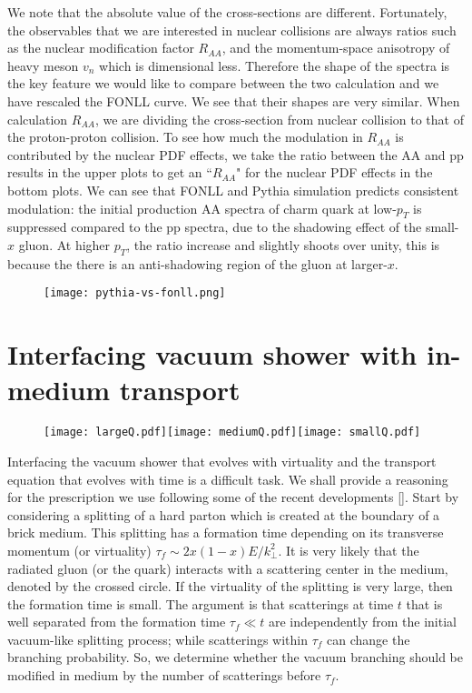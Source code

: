 We note that the absolute value of the cross-sections are different.
Fortunately, the observables that we are interested in nuclear collisions are always ratios such as the nuclear modification factor $R_{AA}$, and the momentum-space anisotropy of heavy meson $v_n$ which is dimensional less. 
Therefore the shape of the spectra is the key feature we would like to compare between the two calculation and we have rescaled the FONLL curve.
We see that their shapes are very similar.
When calculation $R_{AA}$, we are dividing the cross-section from nuclear collision to that of the proton-proton collision.
To see how much the modulation in $R_{AA}$ is contributed by the nuclear PDF effects, we take the ratio between the AA and pp results in the upper plots to get an ``$R_{AA}$" for the nuclear PDF effects in the bottom plots.
We can see that FONLL and Pythia simulation predicts consistent modulation: the initial production AA spectra of charm quark at low-$p_T$ is suppressed compared to the pp spectra, due to the shadowing effect of the small-$x$ gluon. 
At higher $p_T$, the ratio increase and slightly shoots over  unity, this is because the there is an anti-shadowing region of the gluon at larger-$x$.

\begin{figure}
\centering
\texttt{[image: pythia-vs-fonll.png]}
\caption{}
\label{fig:pythia-fonll}
\end{figure}

\section{Interfacing vacuum shower with in-medium transport}

\begin{figure}
\texttt{[image: largeQ.pdf]}\texttt{[image: mediumQ.pdf]}\texttt{[image: smallQ.pdf]}
\caption{}
\label{fig:vac-med-interface}
\end{figure}
Interfacing the vacuum shower that evolves with virtuality and the transport equation that evolves with time is a difficult task. 
We shall provide a reasoning for the prescription we use following some of the recent developments [].
Start by considering a splitting of a hard parton which is created at the boundary of a brick medium.
This splitting has a formation time depending on its transverse momentum (or virtuality) $\tau_f \sim 2x(1-x)E/k_\perp^2$.
It is very likely that the radiated gluon (or the quark) interacts with a scattering center in the medium, denoted by the crossed circle.
If the virtuality of the splitting is very large, then the formation time is small.
The argument is that scatterings at time $t$ that is well separated from the formation time $\tau_f \ll t$ are independently from the initial vacuum-like splitting process; while scatterings within $\tau_f$ can change the branching probability.
So, we determine whether the vacuum branching should be modified in medium by the number of scatterings before $\tau_f$.

